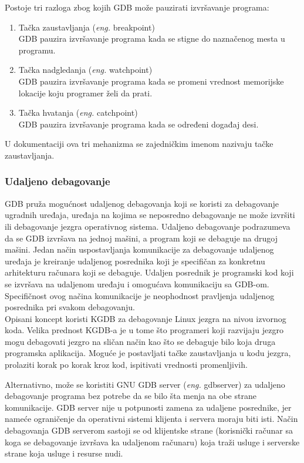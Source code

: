 \documentclass[a4paper]{article}
\begin{document}
Postoje tri razloga zbog kojih GDB može pauzirati izvršavanje programa:\cite{art_debugging}
\begin{enumerate}
\item Tačka zaustavljanja (\textit{eng.} breakpoint) \\
GDB pauzira izvršavanje programa kada se stigne do naznačenog mesta u programu.
\item Tačka nadgledanja (\textit{eng.} watchpoint) \\ 
GDB pauzira izvršavanje programa kada se promeni vrednost memorijske lokacije koju programer želi da prati.
\item Tačka hvatanja (\textit{eng.} catchpoint) \\
GDB pauzira izvršavanje programa kada se određeni događaj desi.
\end{enumerate}
U dokumentaciji ova tri mehanizma se zajedničkim imenom nazivaju tačke zaustavljanja. 

\subsubsection{Udaljeno debagovanje}
\label{subsec:gdb_udaljeno}

GDB pruža mogućnost udaljenog debagovanja koji se koristi za debagovanje ugradnih uređaja, 
uređaja na kojima se neposredno debagovanje ne može izvršiti ili debagovanje jezgra operativnog sistema. 
Udaljeno debagovanje podrazumeva da se GDB izvršava na jednoj mašini, a program koji se debaguje na drugoj mašini.
Jedan način uspostavljanja komunikacije za debagovanje udaljenog uređaja je kreiranje udaljenog posrednika koji je specifičan za konkretnu arhitekturu računara koji se debaguje. Udaljen posrednik je programski kod koji se izvršava na udaljenom uređaju i 
omogućava komunikaciju sa GDB-om. Specifičnost ovog načina komunikacije je neophodnost pravljenja udaljenog posrednika pri svakom debagovanju. \\
Opisani koncept koristi KGDB za debagovanje Linux jezgra na nivou izvornog koda. Velika prednost KGDB-a 
je u tome što programeri koji razvijaju jezgro mogu debagovati jezgro na sličan način kao što se 
debaguje bilo koja druga programska aplikacija. Moguće je postavljati tačke zaustavljanja u kodu jezgra, prolaziti korak po korak kroz kod, ispitivati vrednosti promenljivih\cite{kgd}.

Alternativno, može se koristiti GNU GDB server (\textit{eng.} gdbserver) za udaljeno debagovanje 
programa bez potrebe da se bilo šta menja na obe strane komunikacije. GDB server nije u potpunosti 
zamena za udaljene posrednike, jer nameće ograničenje da operativni sistemi klijenta i servera 
moraju biti isti. 
Način debagovanja GDB serverom sastoji se od klijentske strane (korisnički računar sa koga se 
debagovanje izvršava ka udaljenom računaru) koja traži usluge i serverske strane 
koja usluge i resurse nudi\cite{master_rad}. 
\end{document}
